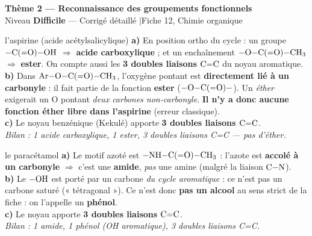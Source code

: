 \documentclass[11pt,a4paper]{article}
\newcommand{\rep}[1]{\textcolor{primarydark}{\textbf{#1}}}
\newcommand{\banner}[2]{%
\begin{tcolorbox}[enhanced,colback=excol,colframe=excol,arc=5pt,boxrule=0pt,
   left=5mm,right=5mm,top=2.5mm,bottom=2.5mm,coltext=white]
{\large\bfseries #1}\\[1pt]{\small #2}
\end{tcolorbox}\vspace{2pt}}
\begin{document}
\banner{Thème 2 — Reconnaissance des groupements fonctionnels}{Niveau \textbf{Difficile} — Corrigé détaillé \quad$\vert$\quad Fiche 12, Chimie organique}

\begin{corr}{l'aspirine (acide acétylsalicylique)}
\textbf{a)} En position ortho du cycle : un groupe $\ce{-C(=O)-OH}$ $\Rightarrow$ \rep{acide carboxylique} ; et un enchaînement $\ce{-O-C(=O)-CH3}$ $\Rightarrow$ \rep{ester}. On compte aussi les \rep{3 doubles liaisons $\ce{C=C}$} du noyau aromatique.\\
\textbf{b)} Dans $\ce{Ar-O-C(=O)-CH3}$, l'oxygène pontant est \textbf{directement lié à un carbonyle} : il fait partie de la fonction \textbf{ester} ($\ce{-O-C(=O)-}$). Un \emph{éther} exigerait un O pontant \emph{deux carbones non-carbonyle}. \rep{Il n'y a donc aucune fonction éther libre dans l'aspirine} (erreur classique).\\
\textbf{c)} Le noyau benzénique (Kekulé) apporte \rep{3 doubles liaisons $\ce{C=C}$}.\\[2pt]
\emph{Bilan : 1 acide carboxylique, 1 ester, 3 doubles liaisons C=C — pas d'éther.}
\end{corr}

\begin{corr}{le paracétamol}
\textbf{a)} Le motif azoté est $\ce{-NH-C(=O)-CH3}$ : l'azote est \textbf{accolé à un carbonyle} $\Rightarrow$ c'est une \rep{amide}, \emph{pas} une amine (malgré la liaison $\ce{C-N}$).\\
\textbf{b)} Le $\ce{-OH}$ est porté par un carbone \emph{du cycle aromatique} : ce n'est pas un carbone saturé (« tétragonal »). Ce n'est donc \rep{pas un alcool} au sens strict de la fiche : on l'appelle un \rep{phénol}.\\
\textbf{c)} Le noyau apporte \rep{3 doubles liaisons $\ce{C=C}$}.\\[2pt]
\emph{Bilan : 1 amide, 1 phénol (OH aromatique), 3 doubles liaisons C=C.}
\end{corr}
\end{document}
